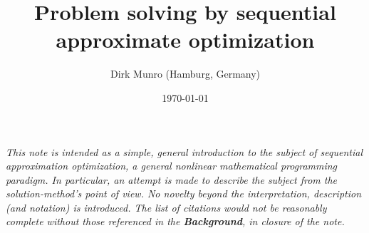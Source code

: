 \documentclass[11pt]{article}
\title{Problem solving by sequential approximate optimization}
\author{Dirk Munro (Hamburg, Germany)}
\date{\today }
\begin{document}
\maketitle





\emph{This note is intended as a simple, general introduction to the subject of {sequential approximation optimization}, a general nonlinear mathematical programming paradigm. In particular, an attempt is made to describe the subject from the solution-method's point of view. No novelty beyond the interpretation, description (and notation) is introduced. The list of citations would not be reasonably complete without those referenced in the \textbf{Background}, in closure of the note.}

\end{document}
